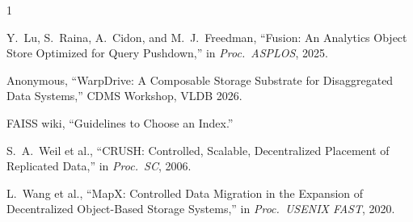\documentclass[10pt,conference]{IEEEtran}
\begin{document}
{\scriptsize
\begin{thebibliography}{1}

Y.~Lu, S.~Raina, A.~Cidon, and M.~J.~Freedman, ``Fusion: An Analytics Object
Store Optimized for Query Pushdown,'' in \emph{Proc.\ ASPLOS}, 2025.

Anonymous, ``WarpDrive: A Composable Storage Substrate for Disaggregated
Data Systems,'' CDMS Workshop, VLDB 2026.

FAISS wiki, ``Guidelines to Choose an Index.''

S.~A.~Weil et al., ``CRUSH: Controlled, Scalable, Decentralized Placement of
Replicated Data,'' in \emph{Proc.\ SC}, 2006.

L.~Wang et al., ``MapX: Controlled Data Migration in the Expansion of
Decentralized Object-Based Storage Systems,'' in \emph{Proc.\ USENIX FAST},
2020.

\end{thebibliography}
}
\end{document}
